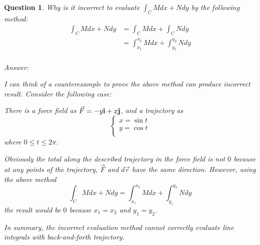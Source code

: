 \documentclass{article}
\newtheorem*{question}{Question}
\newcommand{\uvec}[1]{\boldsymbol{\hat{\textbf{#1}}}}
\begin{document}
\begin{question}
  Why is it incorrect to evaluate $\int_C M dx + N dy$ by the following method:
  \begin{equation*}
    \begin{split}
      \int_C M dx + N dy &= \int_C M dx + \int_C N dy \\
                         &= \int_{x_1}^{x_2} M dx + \int_{y_1}^{y_2} N dy \\
    \end{split}
  \end{equation*}

  Answer:

  I can think of a counterexample to prove the above method can produce 
  incorrect result. Consider the following case:

  There is a force field as $\vec{F} = -y \uvec{\i} + x \uvec{\j}$, and a trajectory as
  \begin{equation*}
    \begin{cases}
      x = \sin t \\
      y = \cos t \\
    \end{cases}
  \end{equation*}
  where $0 \leq t \leq 2 \pi$. 

  Obviously the total along the described trajectory in the force field is not 
  $0$ because at any points of the trajectory, $\vec{F}$ and $d\vec{r}$ have the 
  same direction. However, using the above method
  \begin{equation*}
    \int_C M dx + N dy = \int_{x_1}^{x_2} M dx + \int_{y_1}^{y_2} N dy
  \end{equation*}
  the result would be $0$ because $x_1 = x_2$ and $y_1 = y_2$.

  In summary, the incorrect evaluation method cannot correctly evaluate line 
  integrals with back-and-forth trajectory.
\end{question}
\end{document}
